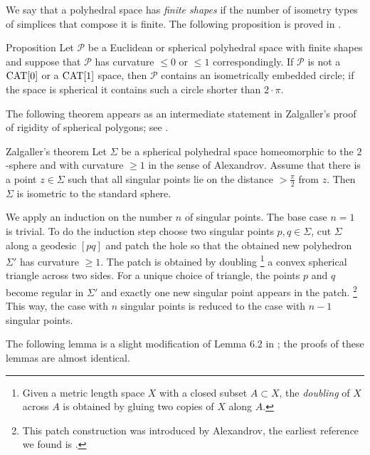 \documentclass[oneside,a4paper]{article}
\def\SS{\mathbb{S}}
\begin{document}
We say that a polyhedral space has \emph{finite shapes} if the number of isometry types of
simplices that compose it is finite.
The following proposition is proved in  \cite[II. 4.17]{bridson-haefliger}.

\begin{thm}{Proposition}\label{geodesic2pi} Let $\mathcal P$ be a Euclidean or spherical polyhedral space  with
finite shapes and suppose that $\mathcal P$ has curvature $\le 0$ or $\le 1$ correspondingly.
If $\mathcal P$ is not a $\mathrm{CAT}[0]$ or a $\mathrm{CAT}[1]$ space, then $\mathcal P$ contains an isometrically embedded
circle; if the space is spherical it contains such a circle shorter than $2{\cdot}\pi$.
\end{thm}

\parbf{Spherical polyhedral metrics on $\bm{\SS^2}$.}
The following theorem appears as an intermediate statement
in Zalgaller's proof of rigidity of spherical polygons;
see \cite{zalgaller}.

\begin{thm}{Zalgaller's theorem}\label{thm:rigid-sphere-2D}
Let $\Sigma$ be a spherical polyhedral space homeomorphic to the $2$-sphere
and with curvature $\ge 1$ in the sense of Alexandrov.
Assume that there is a point $z\in \Sigma$ such that all singular points lie
on the distance $>\tfrac\pi2$ from $z$.
Then $\Sigma$ is isometric to the standard sphere.

\end{thm}


We apply an induction on the number $n$ of singular points.
The base case $n=1$ is trivial.
To do the induction step
choose two singular points $p,q\in\Sigma$,
cut $\Sigma$ along a geodesic $[pq]$
and patch the hole so that the obtained new polyhedron $\Sigma'$ has curvature $\ge 1$.
The patch is obtained by doubling%
\footnote{Given a metric length space $X$ with a closed subset $A\subset X$,
the \emph{doubling} of $X$ across $A$ is obtained by gluing two copies of $X$ along $A$.}
 a convex spherical triangle across two sides.
For a unique choice of triangle, the points $p$ and $q$ become regular in $\Sigma'$
and exactly one new singular point appears in the patch.%
\footnote{This patch construction was introduced by Alexandrov,
the earliest reference we found is
\cite[VI, \S7]{alexandrov1948}.}
This way, the case with $n$ singular points is reduced to the case with $n-1$ singular points.
\qeds

The following lemma is a slight modification of Lemma 6.2 in \cite{allcock};
the proofs of these lemmas are almost identical.
\end{document}

